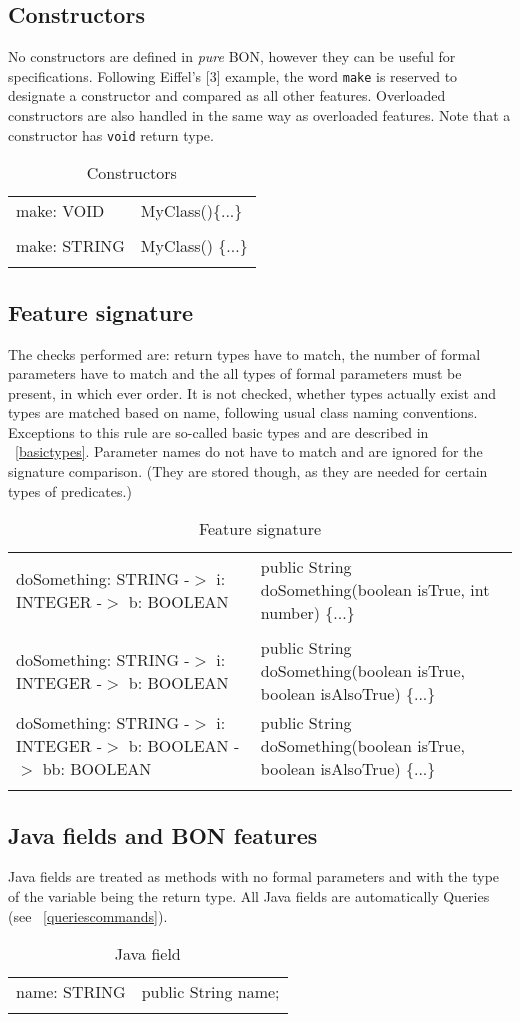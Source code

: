 \documentclass[11pt]{amsart}
\newcommand{\mytablebeg}{\begin{table}[h]\centering\begin{footnotesize}
\begin{tabular}{m{7cm}|m{7cm}} }
\newcommand{\mytableend}[2]{\end{tabular}\end{footnotesize}\caption{#1} \label{#2}\end{table}}
\newcommand{\tick}{\ding{52}}
\newcommand{\cross}{\ding{55}}
\newcommand{\goodline}[2]{\tick #1 & #2\\ \hdashline}
\newcommand{\badline}[2]{\cross #1 & #2 \\ \hdashline}
\newcommand{\emptyline}{\hspace{2mm} & \hspace{2mm}\\ \hdashline}
\begin{document}
\subsection{Constructors}\hfill \newline
No constructors are defined in \emph{pure} BON, however they can be useful for specifications. Following Eiffel's [3] example, the word \texttt{make} is reserved to designate a constructor and compared as all other features. Overloaded constructors are also handled in the same way as overloaded features. Note that a constructor has \texttt{void} return type.
\mytablebeg
\goodline{make: VOID}{MyClass()\{...\} }
\emptyline
\badline{make: STRING}{MyClass() \{...\}}
\mytableend{Constructors}{}


\subsection{Feature signature}\hfill \newline
The checks performed are: return types have to match, the number of formal parameters have to match and the all types of formal parameters must be present, in which ever order. It is not checked, whether types actually exist and types are matched based on name, following usual class naming conventions. Exceptions to this rule are so-called basic types and are described in ~\ref{basictypes}. Parameter names do not have to match and are ignored for the signature comparison. (They are stored though, as they are needed for certain types of predicates.)
\mytablebeg
\goodline{doSomething: STRING \newline -$>$ i: INTEGER \newline -$>$ b: BOOLEAN }{public String doSomething(boolean isTrue, int number) \{...\}}
\emptyline
\badline{doSomething: STRING \newline -$>$ i: INTEGER \newline -$>$ b: BOOLEAN }{public String doSomething(boolean isTrue, boolean isAlsoTrue) \{...\}}
\badline{doSomething: STRING \newline -$>$ i: INTEGER \newline -$>$ b: BOOLEAN \newline -$>$ bb: BOOLEAN}{public String doSomething(boolean isTrue, boolean isAlsoTrue) \{...\}}
\mytableend{Feature signature}{}

\subsection{Java fields and BON features}\hfill \newline
Java fields are treated as methods with no formal parameters and with the type of the variable being the return type. All Java fields are automatically Queries (see ~\ref{queriescommands}).
\mytablebeg
\goodline{name: STRING}{public String name;}
\mytableend{Java field}{}
\end{document}
